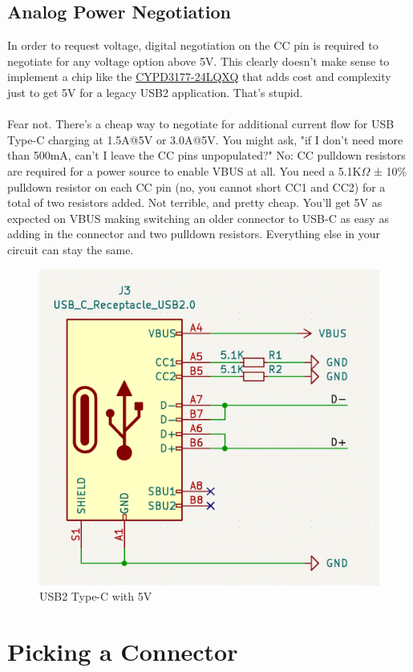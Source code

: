 \documentclass[12pt]{article}
\begin{document}
\subsection{Analog Power Negotiation} \label{sec:AnalogPower}
In order to request voltage, digital negotiation on the CC pin is required to negotiate for any voltage option above 5V. This clearly doesn't make sense to implement a chip like the \href{https://www.infineon.com/dgdl/Infineon-EZ-PD_BCR_Datasheet_USB_Type-C_Port_Controller_for_Power_Sinks-DataSheet-v03_00-EN.pdf?fileId=8ac78c8c7d0d8da4017d0ee7ce9d70ad}{CYPD3177-24LQXQ} that adds cost and complexity just to get 5V for a legacy USB2 application. That's stupid.\\\\
\noindent
Fear not. There's a cheap way to negotiate for additional current flow for USB Type-C charging at 1.5A@5V or 3.0A@5V. You might ask, "if I don't need more than 500mA, can't I leave the CC pins unpopulated?" No: CC pulldown resistors are required for a power source to enable VBUS at all. You need a 5.1K$\Omega$ ± 10\% pulldown resistor on each CC pin (no, you cannot short CC1 and CC2) for a total of two resistors added. Not terrible, and pretty cheap. You'll get 5V as expected on VBUS making switching an older connector to USB-C as easy as adding in the connector and two pulldown resistors. Everything else in your circuit can stay the same.

\begin{figure}[h]
	\centering
	\includegraphics[width=0.55\linewidth]{images/USB-C-Pulldown.png}
	\caption{USB2 Type-C with 5V}
	\label{fig:usb2_5V_usbc}
\end{figure}



\section{Picking a Connector}
\end{document}
